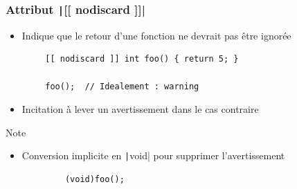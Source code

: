 \documentclass[C++.tex]{subfiles}
\begin{document}
\begin{frame}[fragile]
	\frametitle{Attribut \texttt|[[ nodiscard ]]|}
	\begin{itemize}
		\item Indique que le retour d'une fonction ne devrait pas être ignorée
	\end{itemize}

	\begin{verbatim}
		[[ nodiscard ]] int foo() { return 5; }

		foo();  // Idealement : warning
	\end{verbatim}

	\begin{itemize}
		\item Incitation à lever un avertissement dans le cas contraire
	\end{itemize}

	\begin{block}{Note}
		\begin{itemize}
			\item Conversion implicite en \texttt|void| pour supprimer l'avertissement
		\end{itemize}

		\begin{verbatim}
			(void)foo();
		\end{verbatim}
	\end{block}
\end{frame}
\end{document}

